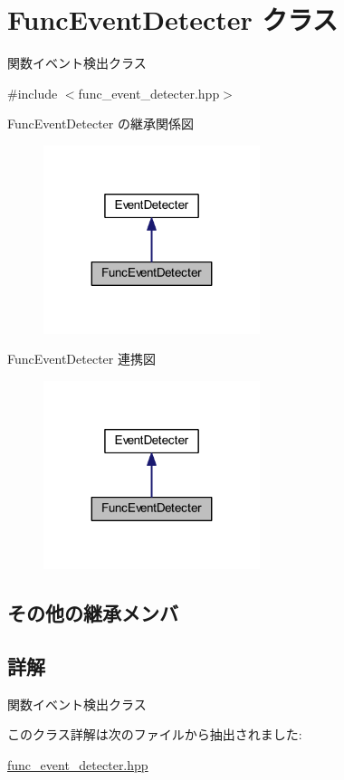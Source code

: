 \hypertarget{class_func_event_detecter}{}\section{Func\+Event\+Detecter クラス}
\label{class_func_event_detecter}


関数イベント検出クラス  




{\ttfamily \#include $<$func\+\_\+event\+\_\+detecter.\+hpp$>$}



Func\+Event\+Detecter の継承関係図
\nopagebreak
\begin{figure}[H]
\begin{center}
\leavevmode
\includegraphics[width=179pt]{class_func_event_detecter__inherit__graph}
\end{center}
\end{figure}


Func\+Event\+Detecter 連携図
\nopagebreak
\begin{figure}[H]
\begin{center}
\leavevmode
\includegraphics[width=179pt]{class_func_event_detecter__coll__graph}
\end{center}
\end{figure}
\subsection*{その他の継承メンバ}


\subsection{詳解}
関数イベント検出クラス 

このクラス詳解は次のファイルから抽出されました\+:\begin{DoxyCompactItemize}
\item 
\mbox{\hyperlink{func__event__detecter_8hpp}{func\+\_\+event\+\_\+detecter.\+hpp}}\end{DoxyCompactItemize}

